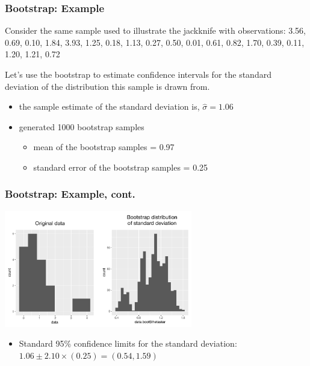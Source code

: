 \documentclass{beamer}
\begin{document}
\begin{frame}
  \frametitle{Bootstrap: Example}

Consider the same sample used to illustrate the jackknife with observations: 3.56, 0.69, 0.10, 1.84, 3.93, 1.25, 0.18, 1.13, 0.27, 0.50, 0.01, 0.61, 0.82, 1.70, 0.39, 0.11, 1.20, 1.21, 0.72
\medskip

Let's use the bootstrap to estimate confidence intervals for the standard deviation of the distribution this sample is drawn from.

\smallskip

\begin{itemize}
    \item the sample estimate of the standard deviation is, $\widehat{\sigma} = 1.06$
    \item generated 1000 bootstrap samples
    \begin{itemize}
        \item mean of the bootstrap samples = 0.97
        \item standard error of the bootstrap samples = 0.25
    \end{itemize}
\end{itemize}

\end{frame}


\begin{frame}
  \frametitle{Bootstrap: Example, cont.}

\begin{center}
\includegraphics[height=2in]{bootstrap-fig.pdf}
\end{center}

\begin{itemize}    
    \item Standard 95\% confidence limits for the standard deviation: $1.06 \pm 2.10 \times (0.25) = (0.54, 1.59)$
\end{itemize}

\end{frame}
\end{document}
